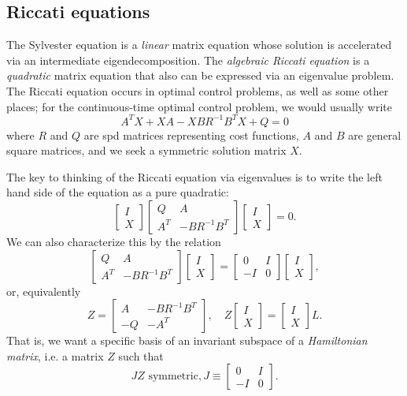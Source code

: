 \documentclass[12pt, leqno]{article} %
\begin{document}
\subsection{Riccati equations}

The Sylvester equation is a {\em linear} matrix equation whose solution
is accelerated via an intermediate eigendecomposition.  The
{\em algebraic Riccati equation} is a {\em quadratic} matrix equation
that also can be expressed via an eigenvalue problem.  The Riccati
equation occurs in optimal control problems, as well as some other places;
for the continuous-time optimal control problem, we would usually write
\[
  A^T X + XA - XBR^{-1} B^T X + Q = 0
\]
where $R$ and $Q$ are spd matrices representing cost functions,
$A$ and $B$ are general square matrices, and we seek a symmetric solution
matrix $X$.

The key to thinking of the Riccati equation via eigenvalues is to write
the left hand side of the equation as a pure quadratic:
\[
  \begin{bmatrix} I \\ X \end{bmatrix}
  \begin{bmatrix} Q & A \\ A^T & -BR^{-1}B^T \end{bmatrix}
  \begin{bmatrix} I \\ X \end{bmatrix} = 0.
\]
We can also characterize this by the relation
\[
  \begin{bmatrix} Q & A \\ A^T & -BR^{-1} B^T \end{bmatrix}
  \begin{bmatrix} I \\ X \end{bmatrix} =
  \begin{bmatrix} 0 & I \\ -I & 0 \end{bmatrix}
  \begin{bmatrix} I \\ X \end{bmatrix},
\]
or, equivalently
\[
  Z = \begin{bmatrix}
    A & -BR^{-1} B^T \\
    -Q & -A^T
  \end{bmatrix}, \quad Z 
  \begin{bmatrix} I \\ X \end{bmatrix} =
  \begin{bmatrix} I \\ X \end{bmatrix} L.
\]
That is, we want a specific basis of an invariant subspace of
a {\em Hamiltonian matrix}, i.e. a matrix $Z$ such that
\[
  JZ \mbox{ symmetric}, J \equiv \begin{bmatrix} 0 & I \\ -I & 0 \end{bmatrix}.
\]
\end{document}
